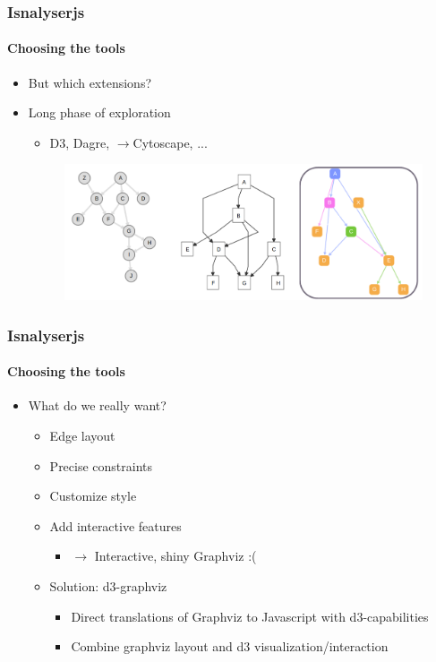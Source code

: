 \documentclass[9pt]{beamer}
\begin{document}
\begin{frame}
\frametitle{Isnalyserjs}
\framesubtitle{Choosing the tools}
\begin{itemize}%
	\item But which extensions?
	\item Long phase of exploration
	\begin{itemize}
		\item D3, Dagre, $\rightarrow$Cytoscape, ...
	\end{itemize}
	\begin{figure}
		\flushleft
		\includegraphics[width=1\linewidth]{figures/js_libs_3.pdf}
	\end{figure}
\end{itemize}
\end{frame} 


\begin{frame}
\frametitle{Isnalyserjs}
\framesubtitle{Choosing the tools}
\begin{itemize}%
	\item What do we really want?
	\pause
	\begin{itemize}
			\item Edge layout
			\item Precise constraints
			\item Customize style
			\item Add interactive features
			\pause
		\begin{itemize}
			\item $\rightarrow$ Interactive, shiny Graphviz :(
		\end{itemize}		
		\pause
		\item Solution: d3-graphviz
	\begin{itemize}
		\item Direct translations of Graphviz to Javascript with d3-capabilities
		\item Combine graphviz layout and d3 visualization/interaction 
	\end{itemize}
	\end{itemize}


\end{itemize}
\end{frame} 
\end{document}
